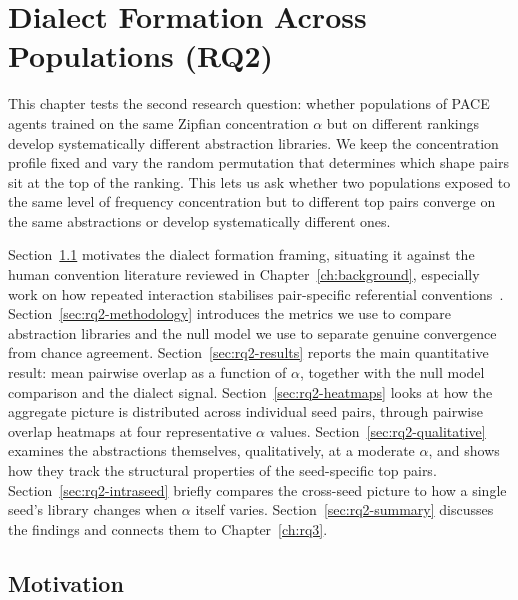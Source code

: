 \chapter{Dialect Formation Across Populations (RQ2)}
\label{ch:rq2}

\providecommand{\missingfigure}[1]{%
\fcolorbox{red}{white}{%
\parbox[c][0.14\textheight][c]{0.9\textwidth}{\centering\textcolor{red}{Placeholder figure\\\texttt{\detokenize{#1}}}}%
}%
}

This chapter tests the second research question: whether populations of PACE agents trained on the same Zipfian concentration $\alpha$ but on different rankings develop systematically different abstraction libraries. We keep the concentration profile fixed and vary the random permutation that determines which shape pairs sit at the top of the ranking. This lets us ask whether two populations exposed to the same level of frequency concentration but to different top pairs converge on the same abstractions or develop systematically different ones.

Section~\ref{sec:rq2-motivation} motivates the dialect formation framing, situating it against the human convention literature reviewed in Chapter~\ref{ch:background}, especially work on how repeated interaction stabilises pair-specific referential conventions~\cite{hawkins_convention-formation_2017,hawkins_characterizing_2020}. Section~\ref{sec:rq2-methodology} introduces the metrics we use to compare abstraction libraries and the null model we use to separate genuine convergence from chance agreement. Section~\ref{sec:rq2-results} reports the main quantitative result: mean pairwise overlap as a function of $\alpha$, together with the null model comparison and the dialect signal. Section~\ref{sec:rq2-heatmaps} looks at how the aggregate picture is distributed across individual seed pairs, through pairwise overlap heatmaps at four representative $\alpha$ values. Section~\ref{sec:rq2-qualitative} examines the abstractions themselves, qualitatively, at a moderate $\alpha$, and shows how they track the structural properties of the seed-specific top pairs. Section~\ref{sec:rq2-intraseed} briefly compares the cross-seed picture to how a single seed's library changes when $\alpha$ itself varies. Section~\ref{sec:rq2-summary} discusses the findings and connects them to Chapter~\ref{ch:rq3}.

\section{Motivation}
\label{sec:rq2-motivation}

